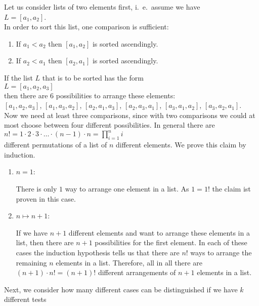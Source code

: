 Let us consider lists of two elements first, i.~e.~assume we have
\\[0.2cm]
\hspace*{1.3cm}
$L = [a_1, a_2]$.  
\\[0.2cm]
In order to sort this list, one comparison is sufficient:
\begin{enumerate}
 \item If $a_1 < a_2$ then $[a_1, a_2]$ is sorted ascendingly.
 \item If $a_2 < a_1$ then $[a_2, a_1]$ is sorted ascendingly.
\end{enumerate}
If the list $L$ that is to be sorted has the form
\\[0.2cm]
\hspace*{1.3cm}
$L = [a_1,a_2,a_3]$ 
\\[0.2cm]
then there are 6 possibilities to arrange these elements:
\\[0.2cm]
\hspace*{0.3cm}
$[a_1,a_2,a_3]$, \quad
$[a_1,a_3,a_2]$, \quad
$[a_2,a_1,a_3]$, \quad
$[a_2,a_3,a_1]$, \quad
$[a_3,a_1,a_2]$, \quad
$[a_3,a_2,a_1]$. 
\\[0.2cm]
Now we need at least three comparisons, since with two comparisons we could at most choose between
four different possibilities.
In general there are 
\\[0.2cm]
\hspace*{1.3cm}
$n! = 1 \cdot 2 \cdot 3 \cdot {\dots} \cdot (n-1) \cdot n = \prod\limits_{i=1}^n i$ 
\\[0.2cm]
different permutations of a list of $n$ different elements. 
We prove this claim by induction. 
\begin{enumerate}
\item $n=1$:  

      There is only $1$ way to arrange one element in a list.  As $1 = 1!$ the claim ist proven
      in this case.
\item $n \mapsto n+1$:
  
      If we have $n+1$ different elements and want to arrange these elements in a list, then there
      are $n+1$ possibilities for the first element.  In each of these cases the induction
      hypothesis tells us that there are $n!$ ways to arrange the remaining $n$ elements in a list.
      Therefore, all in all there are $(n+1) \cdot n! = (n+1)!$ different arrangements of $n+1$
      elements in a list.
\end{enumerate}
Next, we consider how many different cases can be distinguished if we have $k$ different tests
